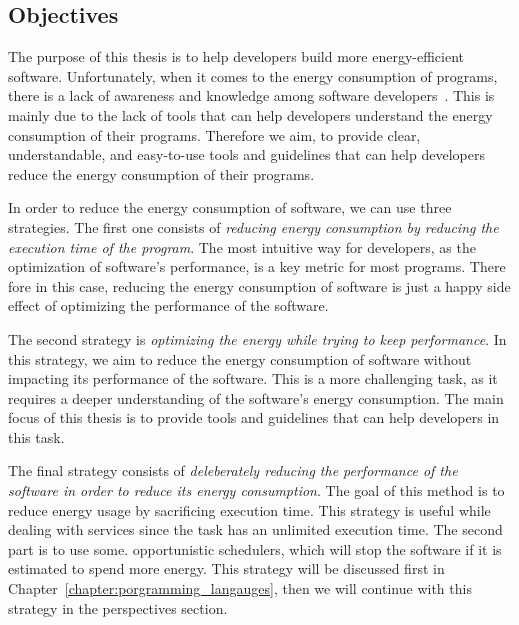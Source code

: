 \subsection{Objectives}
The purpose of this thesis is to help developers build more energy-efficient software. Unfortunately, when it comes to the energy consumption of programs, there is a lack of awareness and knowledge among software developers~\cite{ournani2020reducing,pang2015programmers,pinto2014mining}. This is mainly due to the lack of tools that can help developers understand the energy consumption of their programs. Therefore we aim, to provide clear, understandable, and easy-to-use tools and guidelines that can help developers reduce the energy consumption of their programs.

In order to reduce the energy consumption of software, we can use three strategies.
The first one consists of \emph{reducing energy consumption by reducing the execution time of the program}. The most intuitive way for developers, as the optimization of software's performance, is a key metric for most programs. There fore in this case, reducing the energy consumption of software is just a happy side effect of optimizing the performance of the software.


The second strategy is \emph{optimizing the energy while trying to keep performance}. In this strategy, we aim to reduce the energy consumption of software without impacting its performance of the software. This is a more challenging task, as it requires a deeper understanding of the software's energy consumption. The main focus of this thesis is to provide tools and guidelines that can help developers in this task.


The final strategy consists of \emph{deleberately reducing the performance of the software in order to reduce its energy consumption}. The goal of this method is to reduce energy usage by sacrificing execution time. This strategy is useful while dealing with services since the task has an unlimited execution time. The second part is to use some. opportunistic schedulers, which will stop the software if it is estimated to spend more energy. This strategy will be discussed first in Chapter~\ref{chapter:porgramming_langauges}, then we will continue with this strategy in the perspectives section.



